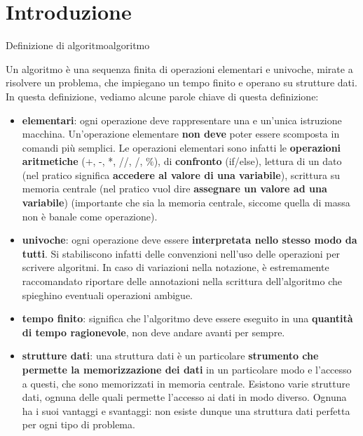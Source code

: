 \documentclass[12pt]{report}
\begin{document}
	

    \chapter{Introduzione}
    
    \begin{definizione}{Definizione di algoritmo}{algoritmo}

    Un algoritmo è una sequenza finita di operazioni elementari e univoche, mirate a risolvere un problema, che impiegano un tempo finito e operano su strutture dati.
    In questa definizione, vediamo alcune parole chiave di questa definizione:
    
	\begin{itemize}
		\item \textbf{elementari}: ogni operazione deve rappresentare una e un’unica istruzione macchina. Un’operazione elementare \textbf{non deve} poter essere scomposta in comandi più semplici.
        Le operazioni elementari sono infatti le \textbf{operazioni aritmetiche} (+, -, *, //, /, $\%$), di \textbf{confronto} (if/else), lettura di un dato (nel pratico significa \textbf{accedere al valore di una variabile}), scrittura su memoria centrale (nel pratico vuol dire \textbf{assegnare un valore ad una variabile}) (importante che sia la memoria centrale, siccome quella di massa non è banale come operazione).
		
		\item \textbf{univoche}: ogni operazione deve essere \textbf{interpretata nello stesso modo da tutti}.
		Si stabiliscono infatti delle convenzioni nell’uso delle operazioni per scrivere algoritmi. In caso di variazioni nella notazione, è estremamente raccomandato riportare delle annotazioni nella scrittura dell’algoritmo che spieghino eventuali operazioni ambigue.
		
		\item \textbf{tempo finito}: significa che l’algoritmo deve essere eseguito in una \textbf{quantità di tempo ragionevole}, non deve andare avanti per sempre.
		
		\item \textbf{strutture dati}: una struttura dati è un particolare \textbf{strumento che permette la memorizzazione dei dati} in un particolare modo e l’accesso a questi, che sono memorizzati in memoria centrale. Esistono varie strutture dati, ognuna delle quali permette l’accesso ai dati in modo diverso. Ognuna ha i suoi vantaggi e svantaggi: non esiste dunque una struttura dati perfetta per ogni tipo di problema.
        
    \end{itemize}
    
    \end{definizione}
        
\end{document}
